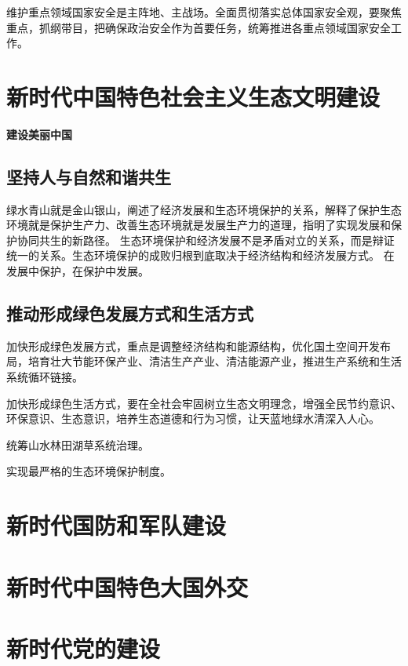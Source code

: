 \documentclass[a4paper, UTF8]{ctexart}
\begin{document}
    维护重点领域国家安全是主阵地、主战场。全面贯彻落实总体国家安全观，要聚焦重点，抓纲带目，把确保政治安全作为首要任务，统筹推进各重点领域国家安全工作。

\section{新时代中国特色社会主义生态文明建设}
    \textbf{建设美丽中国}

    \subsection{坚持人与自然和谐共生}
    绿水青山就是金山银山，阐述了经济发展和生态环境保护的关系，解释了保护生态环境就是保护生产力、改善生态环境就是发展生产力的道理，指明了实现发展和保护协同共生的新路径。
    生态环境保护和经济发展不是矛盾对立的关系，而是辩证统一的关系。生态环境保护的成败归根到底取决于经济结构和经济发展方式。
    在发展中保护，在保护中发展。

    \subsection{推动形成绿色发展方式和生活方式}
    加快形成绿色发展方式，重点是调整经济结构和能源结构，优化国土空间开发布局，培育壮大节能环保产业、清洁生产产业、清洁能源产业，推进生产系统和生活系统循环链接。

    加快形成绿色生活方式，要在全社会牢固树立生态文明理念，增强全民节约意识、环保意识、生态意识，培养生态道德和行为习惯，让天蓝地绿水清深入人心。

    统筹山水林田湖草系统治理。

    实现最严格的生态环境保护制度。


\section{新时代国防和军队建设}

\section{新时代中国特色大国外交}

\section{新时代党的建设}
\end{document}
